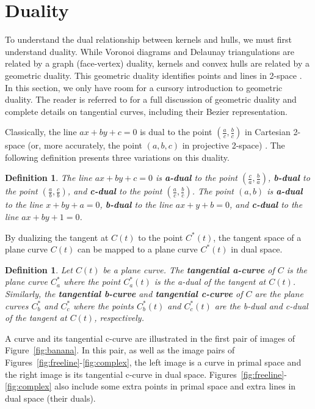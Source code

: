 \documentclass{sig-alternate}
\newtheorem{defn2}[theorem]{Definition}
\begin{document}

\section{Duality}
\label{sec:duality}

To understand the dual relationship between kernels and hulls,
we must first understand duality.
While Voronoi diagrams and Delaunay triangulations are 
related by a graph (face-vertex) duality, 
kernels and convex hulls are related by a geometric duality.
This geometric duality identifies points and lines in 2-space \cite{pedoe70}.
In this section, we only have room for 
a cursory introduction to geometric duality.
The reader is referred to \cite{jj01,jj02} for a full discussion of geometric duality
and complete details on tangential curves, including their Bezier representation.

Classically, the line $ax+by+c=0$ is dual to the point
$(\frac{a}{c},\frac{b}{c})$ in Cartesian 2-space
(or, more accurately, the point $(a,b,c)$ in projective 2-space)
\cite{hartshorne77}.
The following definition presents three variations on this duality.

\begin{defn2}
The line $ax+by+c=0$ is 
{\bf a-dual} to the point $(\frac{c}{a},\frac{b}{a})$,
{\bf b-dual} to the point $(\frac{a}{b},\frac{c}{b})$, and
{\bf c-dual} to the point $(\frac{a}{c},\frac{b}{c})$.
The point $(a,b)$ is 
{\bf a-dual} to the line $x+by+a=0$,
{\bf b-dual} to the line $ax+y+b=0$, and
{\bf c-dual} to the line $ax+by+1=0$.
\end{defn2}

\noindent By dualizing the tangent at $C(t)$ to the point $C^*(t)$,
the tangent space of a plane curve $C(t)$ can be mapped to a
plane curve $C^*(t)$ in dual space.

\begin{defn2}
Let $C(t)$ be a plane curve.
The {\bf tangential a-curve} of $C$ is the plane curve $C^*_a$ where the point $C^*_a(t)$ 
is the a-dual of the tangent at $C(t)$.  Similarly,
the {\bf tangential b-curve} and {\bf tangential c-curve} of $C$ are the plane curves 
$C^*_b$ and $C^*_c$ where the points $C^*_b(t)$ and $C^*_c(t)$ are
the b-dual and c-dual of the tangent at $C(t)$, respectively.
\end{defn2}

A curve and its tangential c-curve are
illustrated in the first pair of images of Figure~\ref{fig:banana}.
In this pair, as well as the image pairs of Figures~\ref{fig:freeline}-\ref{fig:complex},
the left image is a curve in primal space
and the right image is its tangential c-curve in dual space.
Figures~\ref{fig:freeline}-\ref{fig:complex} 
also include some extra points in primal space
and extra lines in dual space (their duals).
\end{document}
